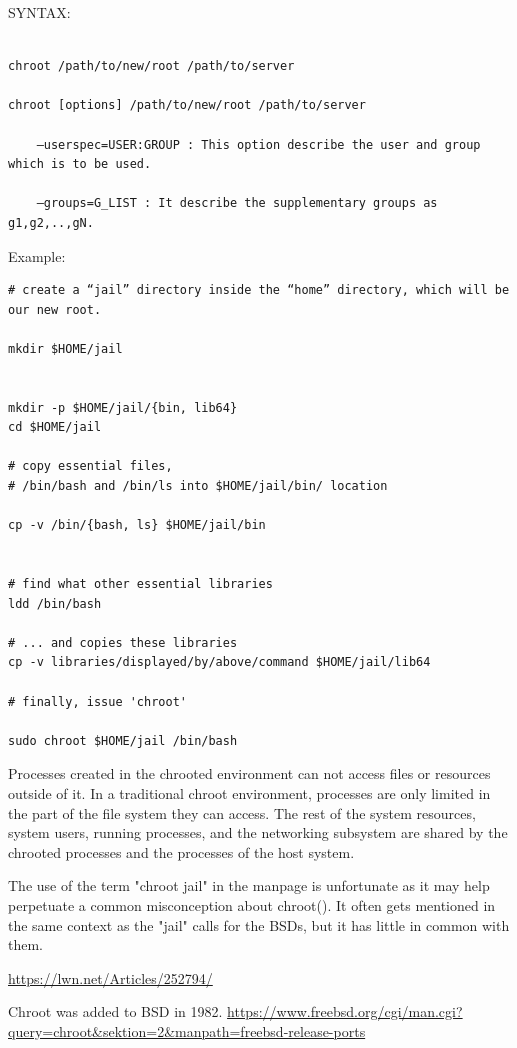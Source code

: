 SYNTAX:
\begin{verbatim}

chroot /path/to/new/root /path/to/server

chroot [options] /path/to/new/root /path/to/server

	–userspec=USER:GROUP : This option describe the user and group which is to be used.
	
	–groups=G_LIST : It describe the supplementary groups as g1,g2,..,gN.
\end{verbatim}

Example:
\begin{verbatim}
# create a “jail” directory inside the “home” directory, which will be our new root.

mkdir $HOME/jail


mkdir -p $HOME/jail/{bin, lib64}
cd $HOME/jail

# copy essential files, 
# /bin/bash and /bin/ls into $HOME/jail/bin/ location

cp -v /bin/{bash, ls} $HOME/jail/bin


# find what other essential libraries
ldd /bin/bash

# ... and copies these libraries
cp -v libraries/displayed/by/above/command $HOME/jail/lib64

# finally, issue 'chroot'

sudo chroot $HOME/jail /bin/bash
\end{verbatim}



Processes created in the chrooted environment can not access files or resources
outside of it.  In a traditional chroot environment, processes are only limited
in the part of the file system they can access. The rest of the system
resources, system users, running processes, and the networking subsystem are
shared by the chrooted processes and the processes of the host system.


\begin{mdframed}


The use of the term "chroot jail" in the manpage is unfortunate as it may help
perpetuate a common misconception about chroot(). It often gets mentioned in the
same context as the "jail" calls for the BSDs, but it has little in common with
them.

\url{https://lwn.net/Articles/252794/}

Chroot was added to BSD in 1982. 
\url{https://www.freebsd.org/cgi/man.cgi?query=chroot&sektion=2&manpath=freebsd-release-ports}
\end{mdframed}

